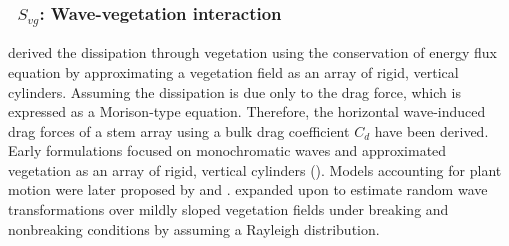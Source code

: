 \vsssub
\subsubsection{~$S_{vg}$: Wave-vegetation interaction} \label{sec:VG1}
\vsssub


\cite{dalrymple1984wave} derived the dissipation through vegetation using the conservation of energy flux equation by approximating a vegetation field as an array of rigid, vertical cylinders. Assuming the dissipation is due only to the drag force, which is expressed as a Morison-type equation. Therefore, the horizontal wave-induced drag forces of a stem array using a bulk drag coefficient $C_d$ have been derived. Early formulations focused on monochromatic waves and approximated vegetation as an array of rigid, vertical cylinders (\cite{dalrymple1984wave,kobayashi1993wave}). Models accounting for plant motion were later proposed by \cite{asano1993interaction} and \cite{mendez1999hydrodynamics}.\cite{mendez2004empirical} expanded upon \cite{dalrymple1984wave} to estimate random wave transformations over mildly sloped vegetation fields under breaking and nonbreaking conditions by assuming a Rayleigh distribution. 

